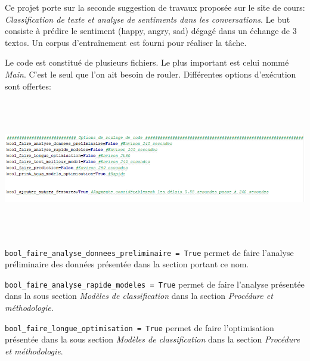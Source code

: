 Ce projet porte sur la seconde suggestion de travaux proposée sur le site de cours: \emph{ Classification de texte et analyse de sentiments dans les conversations}. Le but consiste à prédire le sentiment (happy, angry, sad) dégagé dans un échange de 3 textos. Un corpus d'entraînement est fourni pour réaliser la tâche. 

Le code est constitué de plusieurs fichiers. Le plus important est celui nommé \emph{Main}. C'est le seul que l'on ait besoin de rouler. Différentes options d'exécution sont offertes:

\includegraphics[width=\linewidth,height=6cm]{images/list_bool}


\verb|bool_faire_analyse_donnees_preliminaire = True| permet de faire l'analyse préliminaire des données présentée dans la section portant ce nom. 

\verb|bool_faire_analyse_rapide_modeles = True| permet de faire l'analyse présentée dans la sous section \emph{Modèles de classification} dans la section \emph{Procédure et méthodologie}. 

\verb|bool_faire_longue_optimisation = True| permet de faire l'optimisation présentée dans la sous section \emph{Modèles de classification} dans la section \emph{Procédure et méthodologie}. 

